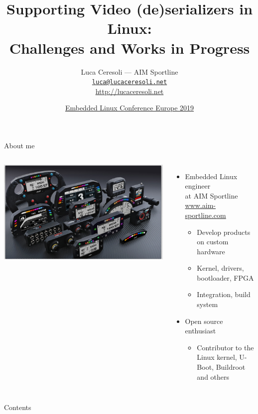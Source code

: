 \documentclass[xetex,table,aspectratio=169]{beamer}
\title{Supporting Video (de)serializers in Linux:\\Challenges and Works in Progress}
\author{Luca Ceresoli --- AIM Sportline\\
  \href{mailto:luca@lucaceresoli.net}{\tt luca@lucaceresoli.net}\\
  \url{http://lucaceresoli.net}
}
\date{\href{https://events19.linuxfoundation.org/events/embedded-linux-conference-europe-2019/}{Embedded Linux Conference Europe 2019}}
\begin{document}
\maketitle

\begin{frame}{About me}
  \begin{columns}
    \includegraphics[width=\textwidth]{../common/images/aim-products.jpg}

    \begin{itemize}
    \item Embedded Linux engineer\\
      at AIM Sportline\\
      {\footnotesize\href{http://www.aim-sportline.com/}{www.aim-sportline.com}}
      \begin{itemize}
      \item Develop products on custom hardware
      \item Kernel, drivers, bootloader, FPGA
      \item Integration, build system
      \end{itemize}
    \item Open source enthusiast
      \begin{itemize}
      \item Contributor to the Linux kernel, U-Boot, Buildroot and others
      \end{itemize}
    \end{itemize}
  \end{columns}
\end{frame}


\begin{frame}{Contents}
  \tableofcontents
\end{frame}
\end{document}
